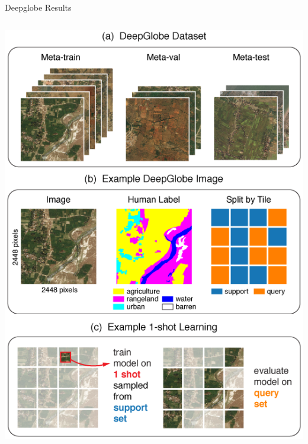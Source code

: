 \documentclass[11pt]{beamer}
\begin{document}
	\begin{frame}{Deepglobe Results}
		\begin{columns}
			\includegraphics[width=\textwidth]{deepglobe/deepglobe_dataset}
			
\end{columns}
\end{frame}
\end{document}
